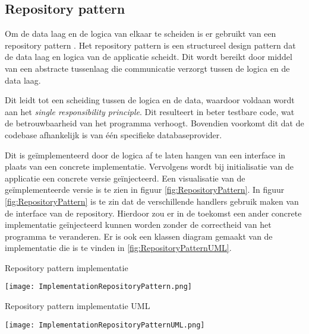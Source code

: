 \subsection{Repository pattern}
Om de data laag en de logica van elkaar te scheiden is er gebruikt van een repository pattern \parencite{RepositoryPattern}.
Het repository pattern is een structureel design pattern dat de data laag en logica van de applicatie scheidt.
Dit wordt bereikt door middel van een abstracte tussenlaag die communicatie verzorgt tussen de logica en de data laag.

\whitespace
Dit leidt tot een scheiding tussen de logica en de data, waardoor voldaan wordt aan het \textit{single responsibility principle}.
Dit resulteert in beter testbare code, wat de betrouwbaarheid van het programma verhoogt.
Bovendien voorkomt dit dat de codebase afhankelijk is van één specifieke databaseprovider.

\whitespace
Dit is geïmplementeerd door de logica af te laten hangen van een interface in plaats van een concrete implementatie.
Vervolgens wordt bij initialisatie van de applicatie  een concrete versie geïnjecteerd.
Een visualisatie van de geïmplementeerde versie is te zien in figuur \ref{fig:RepositoryPattern}.
In figuur \ref{fig:RepositoryPattern} is te zin dat de verschillende handlers gebruik maken van de interface van de repository.
Hierdoor zou er in de toekomst een ander concrete implementatie geïnjecteerd kunnen worden zonder de correctheid van het programma te veranderen.
Er is ook een klassen diagram gemaakt van de implementatie die is te vinden in \ref{fig:RepositoryPatternUML}.


\whitespace[2]
\begin{graphic}
    \captionsetup{type=figure}
    \caption{Repository pattern implementatie}
    \texttt{[image: ImplementationRepositoryPattern.png]}
    \label{fig:RepositoryPattern}
\end{graphic}

\begin{graphic}
    \captionsetup{type=figure}
    \caption{Repository pattern implementatie UML}
    \texttt{[image: ImplementationRepositoryPatternUML.png]}
    \label{fig:RepositoryPatternUML}
\end{graphic}
